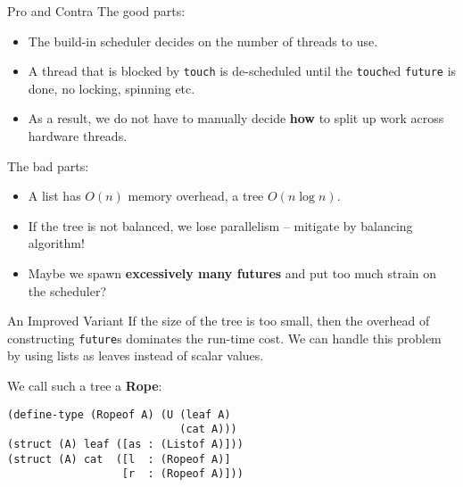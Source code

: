 \documentclass{beamer}
\begin{document}
\begin{frame}{Pro and Contra}
  The good parts:

  \begin{itemize}
  \item The build-in scheduler decides on the number of threads to use.
  \item A thread that is blocked by \lstinline{touch} is de-scheduled until the \lstinline{touch}ed \lstinline{future} is done, no locking, spinning etc.
  \item As a result, we do not have to manually decide \textbf{how} to split up work across hardware threads.
  \end{itemize}

  \pause{}

  The bad parts:
  \begin{itemize}
  \item A list has $O(n)$ memory overhead, a tree $O(n \log n)$.
  \item If the tree is not balanced, we lose parallelism -- mitigate by balancing algorithm!
  \item Maybe we spawn \textbf{excessively many futures} and put too much strain on the scheduler?
  \end{itemize}
\end{frame}

\begin{frame}[fragile]{An Improved Variant}
If the size of the tree is too small, then the overhead of constructing \lstinline{future}s dominates the run-time cost. We can handle this problem by using lists as leaves instead of scalar values.

\vspace{0.5cm}

We call such a tree a \textbf{Rope}:

\begin{lstlisting}
(define-type (Ropeof A) (U (leaf A)
                           (cat A)))
(struct (A) leaf ([as : (Listof A)]))
(struct (A) cat  ([l  : (Ropeof A)]
                  [r  : (Ropeof A)]))
\end{lstlisting}
\end{frame}
\end{document}

